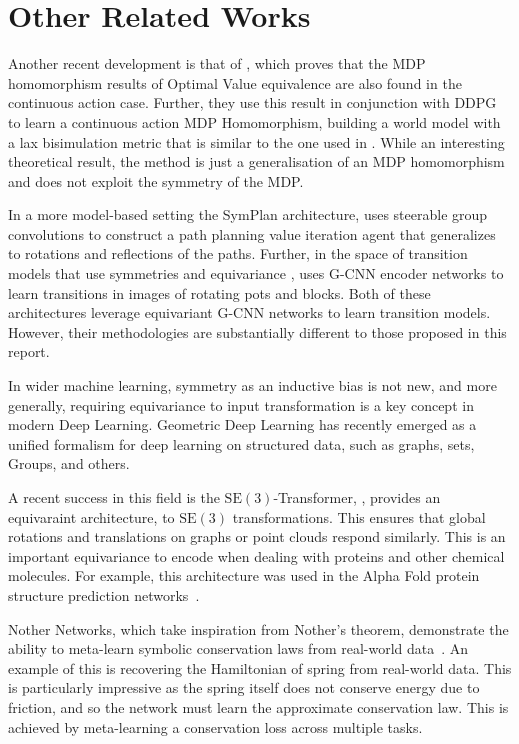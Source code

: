 \section{Other Related Works}

Another recent development is that of \cite{rezaei2022continuous}, which proves that the MDP homomorphism results of Optimal Value equivalence are also found in the continuous action case. Further, they use this result in conjunction with DDPG\cite{lillicrap2015continuous} to learn a continuous action MDP Homomorphism, building a world model with a lax bisimulation metric that is similar to the one used in \cite{van2020plannable}. While an interesting theoretical result, the method is just a generalisation of an MDP homomorphism and does not exploit the symmetry of the MDP.

In a more model-based setting the SymPlan architecture, \cite{zhao2022integrating}  uses steerable group convolutions to construct a path planning value iteration agent that generalizes to rotations and reflections of the paths. Further, in the space of transition models that use symmetries and equivariance \cite{park2022learning}, uses G-CNN encoder networks to learn transitions in images of rotating pots and blocks. Both of these architectures leverage equivariant G-CNN networks to learn transition models. However, their methodologies are substantially different to those proposed in this report.

In wider machine learning, symmetry as an inductive bias is not new, and more generally, requiring equivariance to input transformation is a key concept in modern Deep Learning. Geometric Deep Learning has recently emerged as a unified formalism for deep learning on structured data, such as graphs, sets, Groups, and others.


A recent success in this field is the $\text{SE}(3)$-Transformer, \cite{fuchs2020se}, provides an equivaraint architecture, to $\text{SE}(3)$ transformations. This ensures that global rotations and translations on graphs or point clouds respond similarly. This is an important equivariance to encode when dealing with proteins and other chemical molecules. For example, this architecture was used in the Alpha Fold protein structure prediction networks~\cite{jumper2021highly}.

Nother Networks, which take inspiration from Nother's theorem, demonstrate the ability to meta-learn symbolic conservation laws from real-world data~\cite{alet2021noether}. An example of this is recovering the Hamiltonian of spring from real-world data. This is particularly impressive as the spring itself does not conserve energy due to friction, and so the network must learn the approximate conservation law. This is achieved by meta-learning a conservation loss across multiple tasks.



